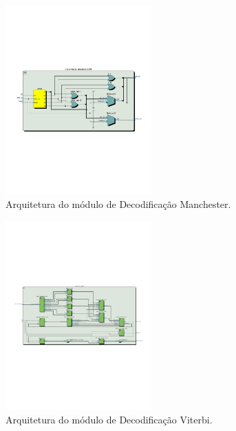 \begin{figure}[h]
	\caption{\label{figure:manchester-decoder-rtl}Arquitetura do módulo de Decodificação Manchester.}
	\centering
	\includegraphics[width=0.5\textwidth, trim={0 7.7cm 0 8.5cm}, clip]{manchester/decoder-rtl.pdf}
\end{figure}

\begin{figure}[h]
	\caption{\label{figure:viterbi-rtl}Arquitetura do módulo de Decodificação Viterbi.}
	\centering
	\includegraphics[width=0.5\textwidth, trim={0 7.7cm 0 8.5cm}, clip]{viterbi/rtl.pdf}
\end{figure}
